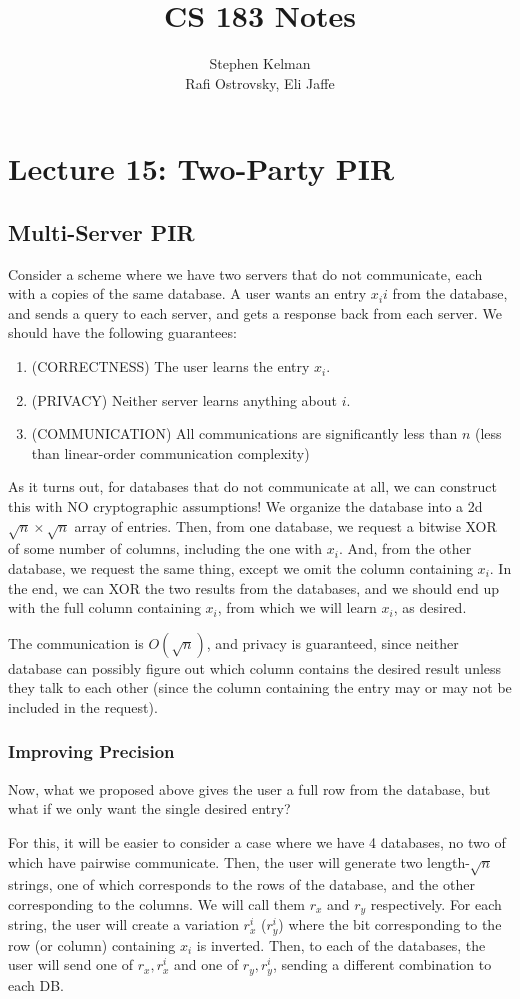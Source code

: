 \documentclass[11pt]{article}
\title{CS 183 Notes}
\author{Stephen Kelman\\ Rafi Ostrovsky, Eli Jaffe}
\begin{document}
\section{Lecture 15: Two-Party PIR}

\subsection{Multi-Server PIR}
Consider a scheme where we have two servers that do not communicate, each with a copies of the same database.
A user wants an entry \(x_ii\) from the database, and sends a query to each server, and gets a response back from each server.
We should have the following guarantees:
\begin{enumerate}
\item (CORRECTNESS) The user learns the entry \(x_i\).
\item (PRIVACY) Neither server learns anything about \(i\).
\item (COMMUNICATION) All communications are significantly less than \(n\) (less than linear-order communication complexity)
\end{enumerate}

As it turns out, for databases that do not communicate at all, we can construct this with NO cryptographic assumptions!
We organize the database into a 2d \(\sqrt{n}\times\sqrt{n}\) array of entries.
Then, from one database, we request a bitwise XOR of some number of columns, including the one with \(x_i\).
And, from the other database, we request the same thing, except we omit the column containing \(x_i\).
In the end, we can XOR the two results from the databases, and we should end up with the full column containing \(x_i\),
from which we will learn \(x_i\), as desired.

The communication is \(O(\sqrt{n})\), and privacy is guaranteed, since neither database can possibly figure out which column contains the desired result unless they talk to each other (since the column containing the entry may or may not be included in the request).

\subsubsection{Improving Precision}
Now, what we proposed above gives the user a full row from the database, but what if we only want the single desired entry?

For this, it will be easier to consider a case where we have 4 databases, no two of which have pairwise communicate.
Then, the user will generate two length-\(\sqrt{n}\) strings, one of which corresponds to the rows of the database, and the other corresponding to the columns.
We will call them \(r_x\) and \(r_y\) respectively. 
For each string, the user will create a variation \(r_x^i\) (\(r_y^i\)) where the bit corresponding to the row (or column) containing \(x_i\) is inverted.
Then, to each of the databases, the user will send one of \(r_x,r_x^i\) and one of \(r_y,r_y^i\), sending a different combination to each DB.
\end{document}
